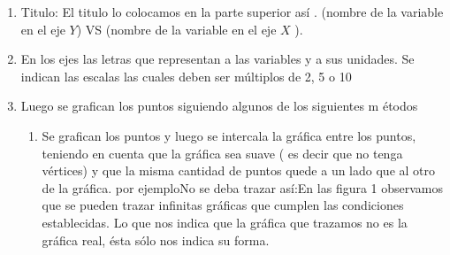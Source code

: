 \documentclass[12pt]{article}
\begin{document}
\begin{enumerate}
\item  Titulo: El titulo lo colocamos en la parte superior as\'{i} .\newline
(nombre de la variable en el eje $Y$) VS (nombre de la variable en el eje $X$%
).

\item  En los ejes las letras que representan a las variables y a sus
unidades. Se indican las escalas las cuales deben ser m\'{u}ltiplos de 2, 5
o 10

\item  Luego se grafican los puntos siguiendo algunos de los siguientes m%
\'{e}todos

\begin{enumerate}
\item  Se grafican los puntos y luego se intercala la gr\'{a}fica entre los
puntos, teniendo en cuenta que la gr\'{a}fica sea suave ( es decir que no
tenga v\'{e}rtices) y que la misma cantidad de puntos quede a un lado que al
otro de la gr\'{a}fica. por ejemploNo se
deba trazar as\'{i}:En las figura 1 observamos que se
pueden trazar infinitas gr\'{a}ficas que cumplen las condiciones
establecidas. \newline
Lo que nos indica que la gr\'{a}fica que trazamos no es la gr\'{a}fica real, 
\'{e}sta s\'{o}lo nos indica su forma.


\end{enumerate}
\end{enumerate}
\end{document}
